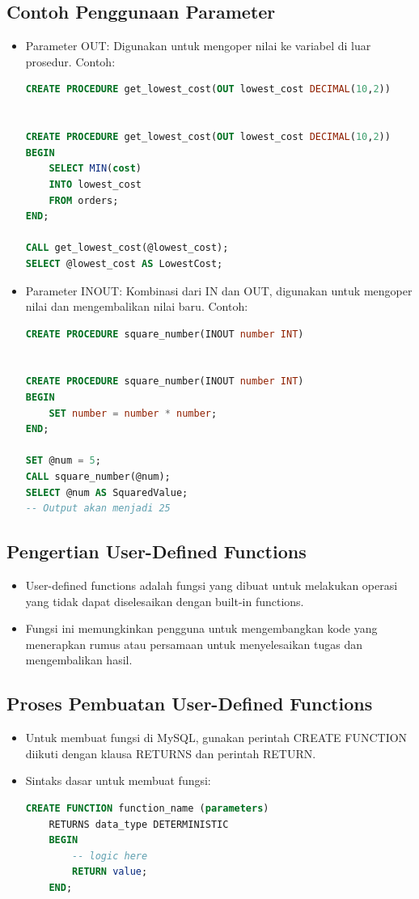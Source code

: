 \documentclass{article}
\begin{document}
\subsection{Contoh Penggunaan Parameter}
\begin{itemize}
    \item Parameter OUT: Digunakan untuk mengoper nilai ke variabel di luar prosedur. Contoh:
          \begin{lstlisting}[language=SQL, caption={}, captionpos=b]
CREATE PROCEDURE get_lowest_cost(OUT lowest_cost DECIMAL(10,2))


CREATE PROCEDURE get_lowest_cost(OUT lowest_cost DECIMAL(10,2))  
BEGIN  
	SELECT MIN(cost) 
	INTO lowest_cost 
	FROM orders; 
END;

CALL get_lowest_cost(@lowest_cost);
SELECT @lowest_cost AS LowestCost;
\end{lstlisting}
    \item Parameter INOUT: Kombinasi dari IN dan OUT, digunakan untuk mengoper nilai dan mengembalikan nilai baru. Contoh:
          \begin{lstlisting}[language=SQL, caption={}, captionpos=b]
CREATE PROCEDURE square_number(INOUT number INT)


CREATE PROCEDURE square_number(INOUT number INT)  
BEGIN  
	SET number = number * number;
END;

SET @num = 5;  
CALL square_number(@num);  
SELECT @num AS SquaredValue; 
-- Output akan menjadi 25
\end{lstlisting}
\end{itemize}

\subsection{Pengertian User-Defined Functions}
\begin{itemize}
    \item User-defined functions adalah fungsi yang dibuat untuk melakukan operasi yang tidak dapat diselesaikan dengan built-in functions.
    \item Fungsi ini memungkinkan pengguna untuk mengembangkan kode yang menerapkan rumus atau persamaan untuk menyelesaikan tugas dan mengembalikan hasil.
\end{itemize}

\subsection{Proses Pembuatan User-Defined Functions}
\begin{itemize}
    \item Untuk membuat fungsi di MySQL, gunakan perintah CREATE FUNCTION diikuti dengan klausa RETURNS dan perintah RETURN.
    \item Sintaks dasar untuk membuat fungsi:
          \begin{lstlisting}[language=SQL, caption={}, captionpos=b]
CREATE FUNCTION function_name (parameters)
    RETURNS data_type DETERMINISTIC
    BEGIN
        -- logic here
        RETURN value;
    END;
\end{lstlisting}
\end{itemize}
\end{document}
